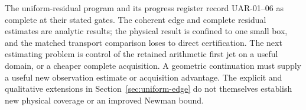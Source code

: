 The 
{uniform-residual program} and its
{progress register} record UAR-01--06 as complete at their stated gates.
The coherent edge and complete residual estimates are analytic results;
the physical result is confined to one small box, and the matched
transport comparison loses to direct certification.
The next estimating problem is control of the retained arithmetic first
jet on a useful domain, or a cheaper complete acquisition.
A geometric continuation must supply a useful new observation estimate
or acquisition advantage. The explicit and qualitative extensions in
Section~\ref{sec:uniform-edge} do not themselves establish new physical
coverage or an improved Newman bound.

